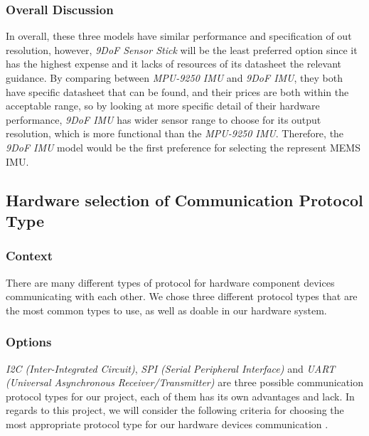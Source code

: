 \hfill \break
\subsubsection{Overall Discussion}
In overall, these three models have similar performance and specification of out resolution, however, \textit{9DoF Sensor Stick} will be the least preferred option since it has the highest expense and it lacks of resources of its datasheet the relevant guidance.
By comparing between \textit{MPU-9250 IMU} and \textit{9DoF IMU}, they both have specific datasheet that can be found, and their prices are both within the acceptable range, so by looking at more specific detail of their hardware performance, \textit{9DoF IMU} has wider sensor range to choose for its output resolution, which is more functional than the \textit{MPU-9250 IMU}.
Therefore, the \textit{9DoF IMU} model would be the first preference for selecting the represent MEMS IMU.




\subsection{Hardware selection of Communication Protocol Type}
\subsubsection{Context}
There are many different types of protocol for hardware component devices communicating with each other.
We chose three different protocol types that are the most common types to use, as well as doable in our hardware system.\\

\subsubsection{Options}
\textit{I2C (Inter-Integrated Circuit)}, \textit{SPI (Serial Peripheral Interface)} and \textit{UART (Universal Asynchronous Receiver/Transmitter)} are three possible communication protocol types for our project, each of them has its own advantages and lack.
In regards to this project, we will consider the following criteria for choosing the most appropriate protocol type for our hardware devices communication \cite{protocol1}.\\

